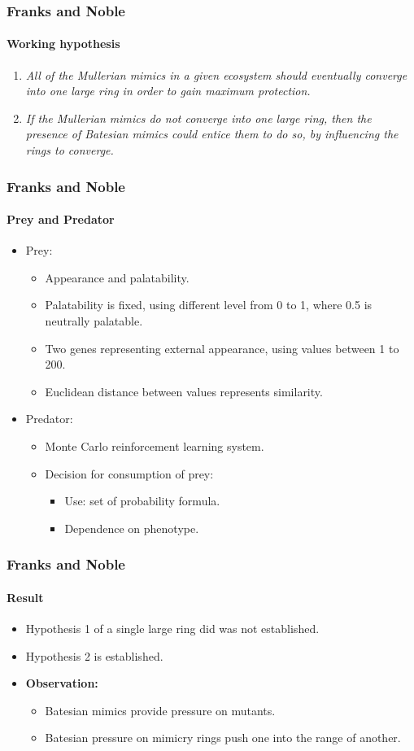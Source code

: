 \frame
{
	\frametitle{Franks and Noble}
	\framesubtitle{Working hypothesis}

	\begin{enumerate}
		\item \textsl{All of the Mullerian mimics in a given ecosystem should eventually converge into one large ring in order to gain maximum protection.}
		\item \textsl{If the Mullerian mimics do not converge into one large ring, then the presence of Batesian mimics could entice them to do so, by influencing the rings to converge.}
	\end{enumerate}
}

\frame
{
	\frametitle{Franks and Noble}
	\framesubtitle{Prey and Predator}
	
\begin{itemize}
	\item Prey:
		\begin{itemize}
			\item Appearance and palatability.
			\item Palatability is fixed, using different level from 0 to 1, where 0.5 is neutrally palatable.
			\item Two genes representing external appearance, using values between 1 to 200.
			\item Euclidean distance between values represents similarity.
		\end{itemize}	
	\item Predator:
		\begin{itemize}
			\item Monte Carlo reinforcement learning system.
			\item Decision for consumption of prey:
			\begin{itemize}
				\item Use: set of probability formula.
				\item Dependence on phenotype.
			\end{itemize}
		\end{itemize}
\end{itemize}

}

\frame
{
	\frametitle{Franks and Noble}
	\framesubtitle{Result}

	\begin{itemize}
		\item Hypothesis 1 of a single large ring did was not established.
		\item Hypothesis 2 is established.
		\item \textbf{Observation:}
			\begin{itemize}
				\item Batesian mimics provide pressure on mutants.
				\item Batesian pressure on mimicry rings push one into the range of another.
			\end{itemize}
	\end{itemize}
}


